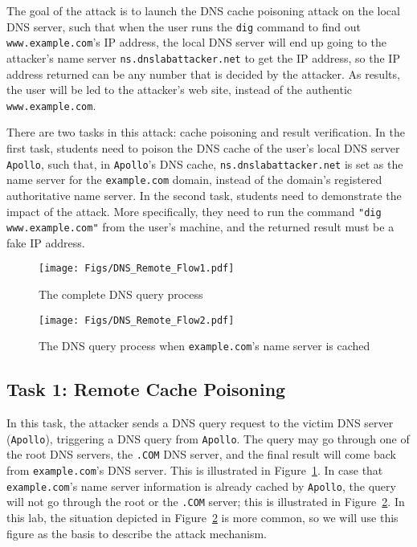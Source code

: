 The goal of the attack is to launch the DNS cache poisoning attack
on the local DNS server, such that 
when the user runs the {\tt dig} command to find out {\tt
www.example.com}'s IP address, the local DNS server will end
up going to the attacker's name server {\tt ns.dnslabattacker.net} 
to get the IP address, so the IP address returned can be 
any number that is decided by the attacker. As results, the 
user will be led to the attacker's web site,
instead of the authentic {\tt www.example.com}.



There are two tasks in this attack: cache poisoning and result
verification.  In the first task, 
students need to poison the DNS cache of the user's local DNS server {\tt
Apollo}, such that, in {\tt Apollo}'s DNS cache,
{\tt ns.dnslabattacker.net} is set as the name server for 
the {\tt example.com} domain, instead of the domain's 
registered authoritative name server. 
In the second task, students need to demonstrate the impact of the attack.
More specifically, they need to run the command {\tt "dig
www.example.com"} from the user's machine, and the returned 
result must be a fake IP address. 




\begin{figure}[H]
\centering
\texttt{[image: Figs/DNS\_Remote\_Flow1.pdf]}
\caption{The complete DNS query process} 
\label{fig:flow_diagram1}
\end{figure}


\begin{figure}[H]
\centering
\texttt{[image: Figs/DNS\_Remote\_Flow2.pdf]}
\caption{The DNS query process when {\tt example.com}'s name server is cached}
\label{fig:flow_diagram2}
\end{figure}


\subsection{Task 1: Remote Cache Poisoning}

In this task, the attacker sends a DNS query request to the victim
DNS server ({\tt Apollo}), triggering a DNS query from {\tt Apollo}. The
query may go through one of the root DNS servers, the {\tt .COM} DNS server, and 
the final result will come back from {\tt example.com}'s DNS server. This 
is illustrated in Figure~\ref{fig:flow_diagram1}. In case that 
{\tt example.com}'s name server information is already cached by 
{\tt Apollo}, the query will not go through the root or the 
{\tt .COM} server; this is illustrated in Figure~\ref{fig:flow_diagram2}.
In this lab, the situation depicted in  Figure~\ref{fig:flow_diagram2} is 
more common, so we will use this figure as the basis to describe 
the attack mechanism.

